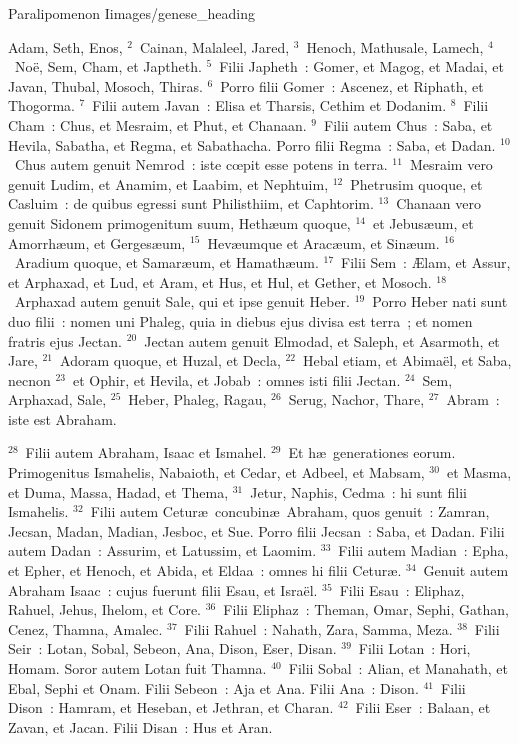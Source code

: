 {Paralipomenon I}{images/genese_heading}


\bchapter
\lettrine[lines=6,image=true,loversize=0.05,lraise=-0.03]{A}{}dam, Seth, Enos,
${}^{2}$~Cainan, Malaleel, Jared,
${}^{3}$~Henoch, Mathusale, Lamech,
${}^{4}$~No\"e, Sem, Cham, et Japtheth.
${}^{5}$~Filii Japheth~: Gomer, et Magog, et Madai, et Javan, Thubal, Mosoch, Thiras.
${}^{6}$~Porro filii Gomer~: Ascenez, et Riphath, et Thogorma.
${}^{7}$~Filii autem Javan~: Elisa et Tharsis, Cethim et Dodanim.
${}^{8}$~Filii Cham~: Chus, et Mesraim, et Phut, et Chanaan.
${}^{9}$~Filii autem Chus~: Saba, et Hevila, Sabatha, et Regma, et Sabathacha. Porro filii Regma~: Saba, et Dadan.
${}^{10}$~Chus autem genuit Nemrod~: iste cœpit esse potens in terra.
${}^{11}$~Mesraim vero genuit Ludim, et Anamim, et Laabim, et Nephtuim,
${}^{12}$~Phetrusim quoque, et Casluim~: de quibus egressi sunt Philisthiim, et Caphtorim.
${}^{13}$~Chanaan vero genuit Sidonem primogenitum suum, Heth\ae um quoque,
${}^{14}$~et Jebus\ae um, et Amorrh\ae um, et Gerges\ae um,
${}^{15}$~Hev\ae umque et Arac\ae um, et Sin\ae um.
${}^{16}$~Aradium quoque, et Samar\ae um, et Hamath\ae um.
${}^{17}$~Filii Sem~: \AE lam, et Assur, et Arphaxad, et Lud, et Aram, et Hus, et Hul, et Gether, et Mosoch.
${}^{18}$~Arphaxad autem genuit Sale, qui et ipse genuit Heber.
${}^{19}$~Porro Heber nati sunt duo filii~: nomen uni Phaleg, quia in diebus ejus divisa est terra~; et nomen fratris ejus Jectan.
${}^{20}$~Jectan autem genuit Elmodad, et Saleph, et Asarmoth, et Jare,
${}^{21}$~Adoram quoque, et Huzal, et Decla,
${}^{22}$~Hebal etiam, et Abima\"el, et Saba, necnon
${}^{23}$~et Ophir, et Hevila, et Jobab~: omnes isti filii Jectan.
${}^{24}$~Sem, Arphaxad, Sale,
${}^{25}$~Heber, Phaleg, Ragau,
${}^{26}$~Serug, Nachor, Thare,
${}^{27}$~Abram~: iste est Abraham.


${}^{28}$~Filii autem Abraham, Isaac et Ismahel.
${}^{29}$~Et h\ae\ generationes eorum. Primogenitus Ismahelis, Nabaioth, et Cedar, et Adbeel, et Mabsam,
${}^{30}$~et Masma, et Duma, Massa, Hadad, et Thema,
${}^{31}$~Jetur, Naphis, Cedma~: hi sunt filii Ismahelis.
${}^{32}$~Filii autem Cetur\ae\ concubin\ae\ Abraham, quos genuit~: Zamran, Jecsan, Madan, Madian, Jesboc, et Sue. Porro filii Jecsan~: Saba, et Dadan. Filii autem Dadan~: Assurim, et Latussim, et Laomim.
${}^{33}$~Filii autem Madian~: Epha, et Epher, et Henoch, et Abida, et Eldaa~: omnes hi filii Cetur\ae .
${}^{34}$~Genuit autem Abraham Isaac~: cujus fuerunt filii Esau, et Isra\"el.
${}^{35}$~Filii Esau~: Eliphaz, Rahuel, Jehus, Ihelom, et Core.
${}^{36}$~Filii Eliphaz~: Theman, Omar, Sephi, Gathan, Cenez, Thamna, Amalec.
${}^{37}$~Filii Rahuel~: Nahath, Zara, Samma, Meza.
${}^{38}$~Filii Seir~: Lotan, Sobal, Sebeon, Ana, Dison, Eser, Disan.
${}^{39}$~Filii Lotan~: Hori, Homam. Soror autem Lotan fuit Thamna.
${}^{40}$~Filii Sobal~: Alian, et Manahath, et Ebal, Sephi et Onam. Filii Sebeon~: Aja et Ana. Filii Ana~: Dison.
${}^{41}$~Filii Dison~: Hamram, et Heseban, et Jethran, et Charan.
${}^{42}$~Filii Eser~: Balaan, et Zavan, et Jacan. Filii Disan~: Hus et Aran.


